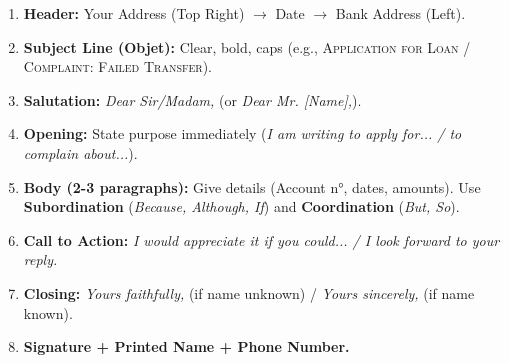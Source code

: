 \documentclass[11pt]{article}
\begin{document}
\begin{bilan}
\begin{methode}
\begin{enumerate}
    \item \textbf{Header:} Your Address (Top Right) $\rightarrow$ Date $\rightarrow$ Bank Address (Left).
    \item \textbf{Subject Line (Objet):} Clear, bold, caps (e.g., \textsc{Application for Loan / Complaint: Failed Transfer}).
    \item \textbf{Salutation:} \textit{Dear Sir/Madam,} (or \textit{Dear Mr. [Name],}).
    \item \textbf{Opening:} State purpose immediately (\textit{I am writing to apply for... / to complain about...}).
    \item \textbf{Body (2-3 paragraphs):} Give details (Account n°, dates, amounts). Use \textbf{Subordination} (\textit{Because, Although, If}) and \textbf{Coordination} (\textit{But, So}).
    \item \textbf{Call to Action:} \textit{I would appreciate it if you could... / I look forward to your reply.}
    \item \textbf{Closing:} \textit{Yours faithfully,} (if name unknown) / \textit{Yours sincerely,} (if name known).
    \item \textbf{Signature + Printed Name + Phone Number.}
\end{enumerate}
\end{methode}

\end{bilan}
\end{document}
